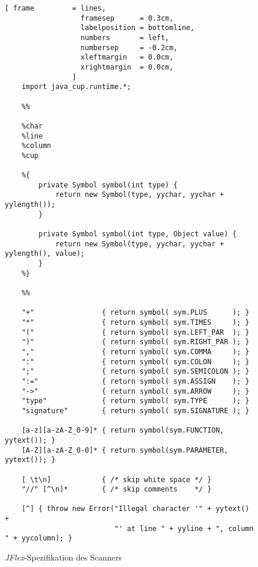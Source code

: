 \begin{figure}[!ht]
\centering
\begin{Verbatim}[ frame         = lines, 
                  framesep      = 0.3cm, 
                  labelposition = bottomline,
                  numbers       = left,
                  numbersep     = -0.2cm,
                  xleftmargin   = 0.0cm,
                  xrightmargin  = 0.0cm,
                ]
    import java_cup.runtime.*;
          
    %%
       
    %char
    %line
    %column
    %cup
       
    %{   
        private Symbol symbol(int type) {
            return new Symbol(type, yychar, yychar + yylength());
        }
        
        private Symbol symbol(int type, Object value) {
            return new Symbol(type, yychar, yychar + yylength(), value);
        }
    %}
       
    %%
       
    "+"                { return symbol( sym.PLUS      ); } 
    "*"                { return symbol( sym.TIMES     ); } 
    "("                { return symbol( sym.LEFT_PAR  ); } 
    ")"                { return symbol( sym.RIGHT_PAR ); }
    ","                { return symbol( sym.COMMA     ); }
    ":"                { return symbol( sym.COLON     ); }
    ";"                { return symbol( sym.SEMICOLON ); }
    ":="               { return symbol( sym.ASSIGN    ); }
    "->"               { return symbol( sym.ARROW     ); }
    "type"             { return symbol( sym.TYPE      ); }
    "signature"        { return symbol( sym.SIGNATURE ); }
    
    [a-z][a-zA-Z_0-9]* { return symbol(sym.FUNCTION,  yytext()); }
    [A-Z][a-zA-Z_0-0]* { return symbol(sym.PARAMETER, yytext()); }
    
    [ \t\n]            { /* skip white space */ }   
    "//" [^\n]*        { /* skip comments    */ }   
    
    [^] { throw new Error("Illegal character '" + yytext() + 
                          "' at line " + yyline + ", column " + yycolumn); }
\end{Verbatim}
\vspace*{-0.3cm}
\caption{\textsl{JFlex}-Spezifikation des Scanners}
\label{fig:typeChecker.jflex}
\end{figure}


